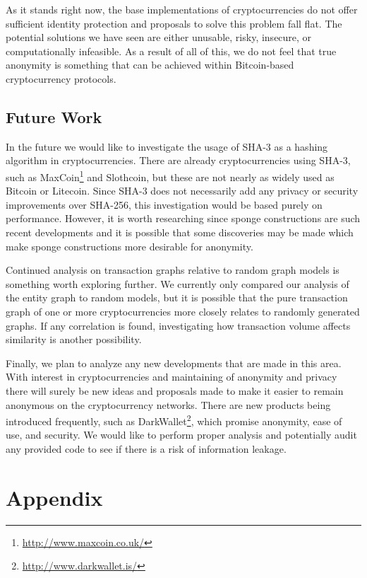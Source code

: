 \documentclass[11pt]{article}
\begin{document}
As it stands right now, the base implementations of cryptocurrencies do not offer sufficient identity protection and
proposals to solve this problem fall flat. The potential solutions we have seen are either unusable, risky, insecure, or
computationally infeasible. As a result of all of this, we do not feel that true anonymity is something that can be
achieved within Bitcoin-based cryptocurrency protocols.

\subsection{Future Work}
In the future we would like to investigate the usage of SHA-3 as a hashing algorithm in cryptocurrencies. There are
already cryptocurrencies using SHA-3, such as MaxCoin\footnote{\url{http://www.maxcoin.co.uk/}} and Slothcoin, but these
are not nearly as widely used as Bitcoin or Litecoin. Since SHA-3 does not necessarily add any privacy or security
improvements over SHA-256, this investigation would be based purely on performance. However, it is worth researching
since sponge constructions are such recent developments and it is possible that some discoveries may be made which make
sponge constructions more desirable for anonymity.

Continued analysis on transaction graphs relative to random graph models is something worth exploring further. We
currently only compared our analysis of the entity graph to random models, but it is possible that the pure transaction
graph of one or more cryptocurrencies more closely relates to randomly generated graphs. If any correlation is found,
investigating how transaction volume affects similarity is another possibility.

Finally, we plan to analyze any new developments that are made in this area. With interest in cryptocurrencies and
maintaining of anonymity and privacy there will surely be new ideas and proposals made to make it easier to remain
anonymous on the cryptocurrency networks. There are new products being introduced frequently, such as
DarkWallet\footnote{\url{http://www.darkwallet.is/}}, which promise anonymity, ease of use, and security. We would like
to perform proper analysis and potentially audit any provided code to see if there is a risk of information leakage.




\section{Appendix}
\end{document}
